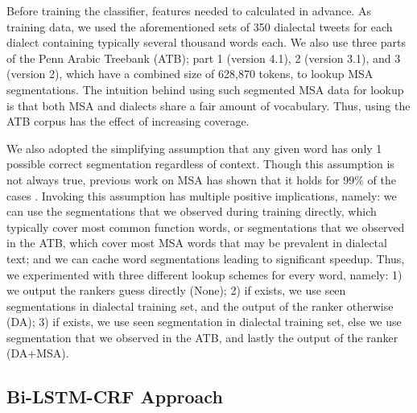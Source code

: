 \documentclass[11pt,letterpaper]{article}
\begin{document}
Before training the classifier, features needed to calculated in advance. As training data, we used the aforementioned sets of 350 dialectal tweets for each dialect containing typically several thousand words each. We also use three parts of the Penn Arabic Treebank (ATB); part 1 (version 4.1), 2 (version 3.1), and 3 (version 2), which have a combined size of 628,870 tokens, to lookup MSA segmentations.  The intuition behind using such segmented MSA data for lookup is that both MSA and dialects share a fair amount of vocabulary. Thus, using the ATB corpus has the effect of increasing coverage. 

We also adopted the simplifying assumption that any given word has only 1 possible correct segmentation regardless of context.  Though this assumption is not always true, previous work on MSA has shown that it holds for 99\% of the cases \cite{abdelali2016farasa}.  Invoking this assumption has multiple positive implications, namely: we can use the segmentations that we observed during training directly, which typically cover most common function words, or segmentations that we observed in the ATB, which cover most MSA words that may be prevalent in dialectal text; and we can cache word segmentations leading to significant speedup.  Thus, we experimented with three different lookup schemes for every word, namely: 1) we output the rankers guess directly (None); 2) if exists, we use seen segmentations in dialectal training set, and the output of the ranker otherwise (DA); 3) if exists, we use seen segmentation in dialectal training set, else we use segmentation that we observed in the ATB, and lastly the output of the ranker (DA+MSA).



\subsection{Bi-LSTM-CRF Approach}
\end{document}
